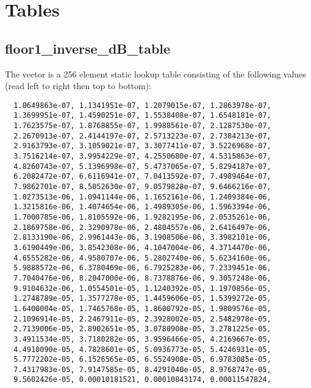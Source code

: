 \section{Tables} \label{vorbis:spec:tables}

\subsection{floor1\_inverse\_dB\_table} \label{vorbis:spec:floor1:inverse:dB:table}

The vector  is a 256 element static
lookup table consisting of the following values (read left to right
then top to bottom):

\begin{Verbatim}
  1.0649863e-07, 1.1341951e-07, 1.2079015e-07, 1.2863978e-07,
  1.3699951e-07, 1.4590251e-07, 1.5538408e-07, 1.6548181e-07,
  1.7623575e-07, 1.8768855e-07, 1.9988561e-07, 2.1287530e-07,
  2.2670913e-07, 2.4144197e-07, 2.5713223e-07, 2.7384213e-07,
  2.9163793e-07, 3.1059021e-07, 3.3077411e-07, 3.5226968e-07,
  3.7516214e-07, 3.9954229e-07, 4.2550680e-07, 4.5315863e-07,
  4.8260743e-07, 5.1396998e-07, 5.4737065e-07, 5.8294187e-07,
  6.2082472e-07, 6.6116941e-07, 7.0413592e-07, 7.4989464e-07,
  7.9862701e-07, 8.5052630e-07, 9.0579828e-07, 9.6466216e-07,
  1.0273513e-06, 1.0941144e-06, 1.1652161e-06, 1.2409384e-06,
  1.3215816e-06, 1.4074654e-06, 1.4989305e-06, 1.5963394e-06,
  1.7000785e-06, 1.8105592e-06, 1.9282195e-06, 2.0535261e-06,
  2.1869758e-06, 2.3290978e-06, 2.4804557e-06, 2.6416497e-06,
  2.8133190e-06, 2.9961443e-06, 3.1908506e-06, 3.3982101e-06,
  3.6190449e-06, 3.8542308e-06, 4.1047004e-06, 4.3714470e-06,
  4.6555282e-06, 4.9580707e-06, 5.2802740e-06, 5.6234160e-06,
  5.9888572e-06, 6.3780469e-06, 6.7925283e-06, 7.2339451e-06,
  7.7040476e-06, 8.2047000e-06, 8.7378876e-06, 9.3057248e-06,
  9.9104632e-06, 1.0554501e-05, 1.1240392e-05, 1.1970856e-05,
  1.2748789e-05, 1.3577278e-05, 1.4459606e-05, 1.5399272e-05,
  1.6400004e-05, 1.7465768e-05, 1.8600792e-05, 1.9809576e-05,
  2.1096914e-05, 2.2467911e-05, 2.3928002e-05, 2.5482978e-05,
  2.7139006e-05, 2.8902651e-05, 3.0780908e-05, 3.2781225e-05,
  3.4911534e-05, 3.7180282e-05, 3.9596466e-05, 4.2169667e-05,
  4.4910090e-05, 4.7828601e-05, 5.0936773e-05, 5.4246931e-05,
  5.7772202e-05, 6.1526565e-05, 6.5524908e-05, 6.9783085e-05,
  7.4317983e-05, 7.9147585e-05, 8.4291040e-05, 8.9768747e-05,
  9.5602426e-05, 0.00010181521, 0.00010843174, 0.00011547824,

\end{Verbatim}
